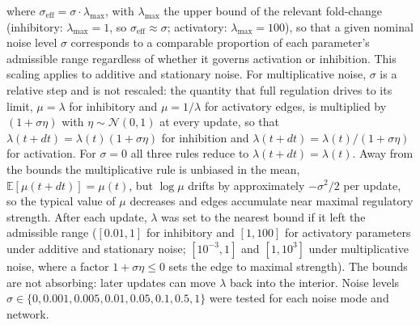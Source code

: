 \documentclass[11pt]{article}
\providecommand{\DIFaddtex}[1]{{\protect\color{red}#1}} %
\providecommand{\DIFdeltex}[1]{} %
\providecommand{\DIFaddbegin}{} %
\providecommand{\DIFaddend}{} %
\providecommand{\DIFdelbegin}{} %
\providecommand{\DIFdelend}{} %
\providecommand{\DIFadd}[1]{\texorpdfstring{\DIFaddtex{#1}}{#1}} %
\providecommand{\DIFdel}[1]{\texorpdfstring{\DIFdeltex{#1}}{}} %
\providecommand{\DIFaddincludegraphics}[2][]{\DIFOincludegraphics[#1]{#2}} %
\providecommand{\DIFdelincludegraphics}[2][]{}
\DeclareRobustCommand{\DIFaddbegin}{\DIFOaddbegin \let\includegraphics\DIFaddincludegraphics} %
\DeclareRobustCommand{\DIFaddend}{\DIFOaddend \let\includegraphics\DIFOincludegraphics} %
\DeclareRobustCommand{\DIFdelbegin}{\DIFOdelbegin \let\includegraphics\DIFdelincludegraphics} %
\DeclareRobustCommand{\DIFdelend}{\DIFOaddend \let\includegraphics\DIFOincludegraphics} %
\begin{document}
where $\sigma_{\text{eff}} = \sigma \cdot \lambda_{\max}$, with $\lambda_{\max}$ the upper bound of the relevant fold-change (inhibitory: $\lambda_{\max} = 1$, so $\sigma_{\text{eff}} \approx \sigma$; activatory: $\lambda_{\max} = 100$), so that a given nominal noise level $\sigma$ corresponds to a comparable proportion of each parameter's admissible range regardless of whether it governs activation or inhibition.  \DIFaddbegin \DIFadd{This scaling applies to additive and stationary noise. }\DIFaddend For multiplicative noise, \DIFdelbegin \DIFdel{the scaling is done such that the noise always pushes the system towards maximum interaction strength, i.e., $\lambda_0 = 0.01$ for inhibitory links and $\lambda_0 = 100$ for activatory links. }\DIFdelend \DIFaddbegin \DIFadd{$\sigma$ is a relative step and is not rescaled: the quantity that full regulation drives to its limit, $\mu = \lambda$ for inhibitory and $\mu = 1/\lambda$ for activatory edges, is multiplied by $(1 + \sigma\eta)$ with $\eta \sim \mathcal{N}(0,1)$ at every update, so that $\lambda(t+dt) = \lambda(t)(1+\sigma\eta)$ for inhibition and $\lambda(t+dt) = \lambda(t)/(1+\sigma\eta)$ for activation. For $\sigma = 0$ all three rules reduce to $\lambda(t+dt) = \lambda(t)$. Away from the bounds the multiplicative rule is unbiased in the mean, $\mathbb{E}[\mu(t+dt)] = \mu(t)$, but $\log\mu$ drifts by approximately $-\sigma^2/2$ per update, so the typical value of $\mu$ decreases and edges accumulate near maximal regulatory strength. }\DIFaddend After each update, $\lambda$ was \DIFdelbegin \DIFdel{clamped to its biologically admissible bounds ($[0.01, 0.999]$ for inhibitory , $[1.01, \lambda_{\max}]$ }\DIFdelend \DIFaddbegin \DIFadd{set to the nearest bound if it left the admissible range ($[0.01, 1]$ for inhibitory and $[1, 100]$ }\DIFaddend for activatory parameters \DIFdelbegin \DIFdel{). }\DIFdelend \DIFaddbegin \DIFadd{under additive and stationary noise; $[10^{-3}, 1]$ and $[1, 10^{3}]$ under multiplicative noise, where a factor $1+\sigma\eta \le 0$ sets the edge to maximal strength). The bounds are not absorbing: later updates can move $\lambda$ back into the interior. }\DIFaddend Noise levels $\sigma \in \{0, 0.001, 0.005, 0.01, 0.05, 0.1, 0.5, 1\}$ were tested for each noise mode and network.
\end{document}
